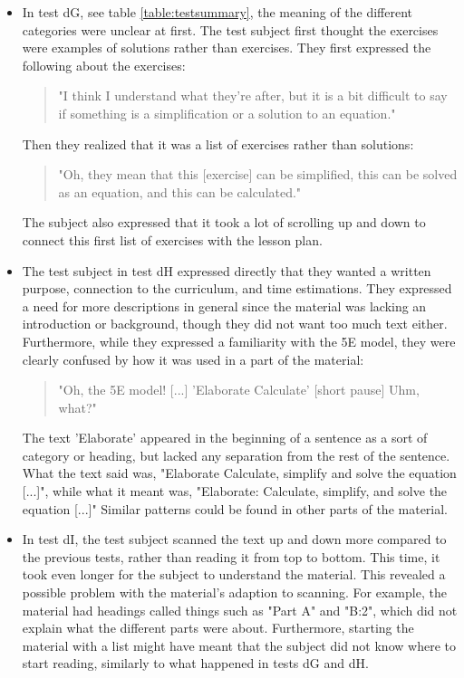 \begin{itemize}
  \item In test dG, see table \ref{table:testsummary}, the meaning of the different categories were unclear at first. The test subject first thought the exercises were examples of solutions rather than exercises. They first expressed the following about the exercises:
		\begin{quote}
			"I think I understand what they're after, but it is a bit difficult to say if something is a simplification or a solution to an equation."
		\end{quote}
		Then they realized that it was a list of exercises rather than solutions:
		\begin{quote}
			"Oh, they mean that this [exercise] can be simplified, this can be solved as an equation, and this can be calculated."
		\end{quote}
		The subject also expressed that it took a lot of scrolling up and down to connect this first list of exercises with the lesson plan.
  \item The test subject in test dH expressed directly that they wanted a written purpose, connection to the curriculum, and time estimations. They expressed a need for more descriptions in general since the material was lacking an introduction or background, though they did not want too much text either. Furthermore, while they expressed a familiarity with the 5E model, they were clearly confused by how it was used in a part of the material:
		\begin{quote}
			"Oh, the 5E model! [...] 'Elaborate Calculate' [short pause] Uhm, what?"
		\end{quote}
		The text 'Elaborate' appeared in the beginning of a sentence as a sort of category or heading, but lacked any separation from the rest of the sentence. What the text said was, "Elaborate Calculate, simplify and solve the equation [...]", while what it meant was, "Elaborate: Calculate, simplify, and solve the equation [...]" Similar patterns could be found in other parts of the material.
  \item In test dI, the test subject scanned the text up and down more compared to the previous tests, rather than reading it from top to bottom. This time, it took even longer for the subject to understand the material. This revealed a possible problem with the material's adaption to scanning. For example, the material had headings called things such as "Part A" and "B:2", which did not explain what the different parts were about. Furthermore, starting the material with a list might have meant that the subject did not know where to start reading, similarly to what happened in tests dG and dH.
\end{itemize}

